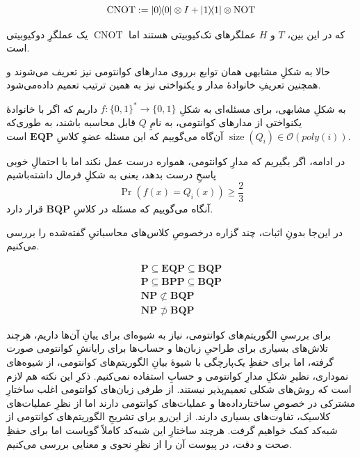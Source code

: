 \documentclass[a4paper,12pt]{article}
\DeclareMathOperator{\size}{size}
\renewcommand{\O}[1]{\mathcal{O}(#1)}
\DeclareMathOperator{\NOT}{NOT}
\DeclareMathOperator{\CNOT}{CNOT}
\begin{document}
\begin{equation}
    \CNOT := \dyad{0} \otimes I + \dyad{1} \otimes \NOT 
\end{equation} 

که در این بین، \(T\) و \(H\) عملگرهای تک‌کیوبیتی هستند اما  \(\CNOT\) یک عملگرِ دوکیوبیتی است.

حالا به شکلِ مشابهی همان توابع برروی مدارهای کوانتومی نیز تعریف می‌شوند و همچنین تعریفِ خانوادهٔ مدار و یکنواختی نیز به همین ترتیب تعمیم داده‌می‌شود.
 

به شکلِ مشابهی، برای مسئله‌ای به شکلِ 
\( f: \{ 0, 1\}^* \to \{ 0, 1\}\)
داریم 
که اگر با خانوادهٔ یکنواختی از مدارهای کوانتومی، به نامِ
\( Q \)
قابل محاسبه باشند، به طوری‌که 
\( \size(Q_i) \in \O{poly(i)} \) 
آن‌گاه می‌گوییم که این مسئله عضوِ کلاسِ
\( \mathbf{EQP} \)
است.

در ادامه، اگر بگیریم که مدارِ کوانتومی، همواره درست عمل نکند اما با احتمالِ خوبی پاسخِ درست بدهد، یعنی به شکلِ فرمال داشته‌باشیم
\begin{equation}
    \Pr(f(x) = Q_i(x)) \ge \frac{2}{3} 
\end{equation} 
آنگاه می‌گوییم که مسئله در کلاسِ
\( \mathbf{BQP} \)
قرار دارد.

در این‌جا بدونِ اثبات، چند گزاره درخصوصِ کلاس‌های محاسباتیِ گفته‌شده را بررسی می‌کنیم.

\begin{eqnarray}
    \mathbf{P} \subseteq \mathbf{EQP} \subseteq \mathbf{BQP} \\ 
    \mathbf{P} \subseteq \mathbf{BPP} \subseteq \mathbf{BQP} \\
    \mathbf{NP} \not\subset \mathbf{BQP} \\
    \mathbf{NP} \not\supset \mathbf{BQP}
\end{eqnarray}

برای بررسیِ الگوریتم‌های کوانتومی، نیاز به شیوه‌ای برای ییانِ آن‌ها داریم، هرچند تلاش‌های بسیاری برای طراحیِ زبان‌ها و حساب‌ها برای رایانشِ کوانتومی صورت گرفته، اما برای حفظِ یک‌پارچگی با شیوهٔ بیانِ الگوریتم‌های کوانتومی، از شیوه‌های نموداری، نظیرِ شکلِ مدارِ کوانتومی و حسابِ 
استفاده نمی‌کنیم.
ذکرِ این نکته هم لازم است که روش‌های شکلی تعمیم‌پذیر نیستند. از طرفی زبان‌های کوانتومی اغلب ساختارِ مشترکی در خصوصِ ساختارداده‌ها و عملیات‌های کوانتومی دارند اما از نظرِ عملیات‌های کلاسیک، تفاوت‌های بسیاری دارند. از این‌رو برای تشریحِ الگوریتم‌های کوانتومی از شبه‌کد کمک خواهیم گرفت. هرچند ساختارِ این شبه‌کد کاملاً گویاست اما برای حفظِ صحت و دقت، در پیوست آن را از نظرِ نحوی و معنایی بررسی می‌کنیم.
\end{document}
